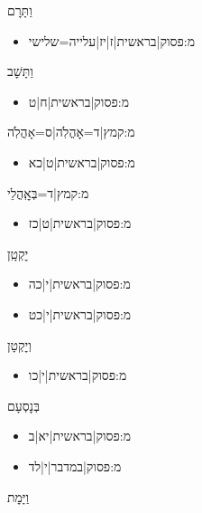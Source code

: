 \begin{itemize}
\begin{itemize}
\end{itemize}
 \item וַתָּרׇם
\begin{itemize} \item {{מ:פסוק|בראשית|ז|יז|עלייה=שלישי}}
\end{itemize}
 \item וַתָּשׇׁב
\begin{itemize} \item {{מ:פסוק|בראשית|ח|ט}}
\end{itemize}
 \item {{מ:קמץ|ד=אׇהֳלֹֽה|ס=אָהֳלֹֽה}}
\begin{itemize} \item {{מ:פסוק|בראשית|ט|כא}}
\end{itemize}
 \item {{מ:קמץ|ד=בְּאׇֽהֳלֵי
\begin{itemize} \item {{מ:פסוק|בראשית|ט|כז}}
\end{itemize}
 \item יׇקְטָֽן
\begin{itemize} \item {{מ:פסוק|בראשית|י|כה}}\item {{מ:פסוק|בראשית|י|כט}}
\end{itemize}
 \item וְיׇקְטָן
\begin{itemize} \item {{מ:פסוק|בראשית|י|כו}}
\end{itemize}
 \item בְּנׇסְעָם
\begin{itemize} \item {{מ:פסוק|בראשית|יא|ב}}\item {{מ:פסוק|במדבר|י|לד}}
\end{itemize}
 \item וַיָּמׇת
}}
\end{itemize}
